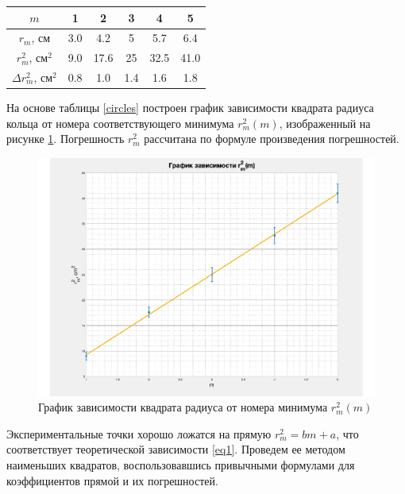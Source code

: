 \documentclass[a4paper,12pt]{article}
\begin{document}
\begin{center}
	\begin{tabular}{|c|c|c|c|c|c|}
		\hline
		$m$           & 1    & 2     & 3   & 4     & 5     \\ \hline
		$r_m$, см       & 3.0 & 4.2  & 5   & 5.7   & 6.4   \\ \hline
		$r_m^2$, см$^2$ & 9.0 & 17.6 & 25  & 32.5 & 41.0 \\ \hline
		$\Delta r_m^2$, см$^2$     & 0.8 & 1.0  & 1.4 & 1.6   & 1.8   \\ \hline
	\end{tabular}
\label{circles}
\end{center}
	
	На основе таблицы \ref{circles} построен график зависимости квадрата радиуса кольца от номера соответствующего минимума $r_m^2(m)$, изображенный на рисунке \ref{r(m)}. Погрешность $r_m^2$ рассчитана по формуле произведения погрешностей. 
	
\begin{center}
	\begin{figure}[hbt!]
		\centering
		\includegraphics[width=\linewidth]{gr1.pdf}
		\caption{График зависимости квадрата радиуса от номера минимума $r_m^2(m)$}
		\label{r(m)}
	\end{figure}
\end{center}
	
	Экспериментальные точки хорошо ложатся на прямую $r_m^2 = bm + a$, что соответствует теоретической зависимости \eqref{eq1}. Проведем ее методом наименьших квадратов, воспользовавшись привычными формулами для коэффициентов прямой и их погрешностей.
	
\end{document}
